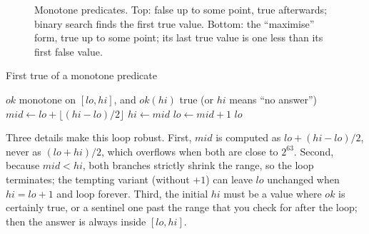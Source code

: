 \begin{figure}[htbp]
\centering
{}
\caption{Monotone predicates. Top: false up to some point, true afterwards; binary search finds the first true value.
Bottom: the ``maximise'' form, true up to some point; its last true value is one less than its first false value.}
\label{fig:monotone}
\end{figure}

\begin{pseudo}{First true of a monotone predicate}
\begin{algorithmic}[1]
\Require $\mathit{ok}$ monotone on $[lo, hi]$, and $\mathit{ok}(hi)$ true (or $hi$ means ``no answer'')
 
  \State $mid \gets lo + \lfloor (hi - lo) / 2 \rfloor$ 
   \State $hi \gets mid$ 
  \Else \State $lo \gets mid + 1$ 
  \EndIf
\EndWhile
\State \Return $lo$
\end{algorithmic}
\end{pseudo}

Three details make this loop robust. First, $mid$ is computed as $lo + (hi - lo)/2$, never as $(lo + hi)/2$, which overflows
when both are close to $2^{63}$. Second, because $mid < hi$, both branches strictly shrink the range, so the loop terminates;
the tempting variant  (without $+1$) can leave $lo$ unchanged when $hi = lo + 1$ and loop forever. Third, the
initial $hi$ must be a value where $\mathit{ok}$ is certainly true, or a sentinel one past the range that you check for after
the loop; then the answer is always inside $[lo, hi]$.


